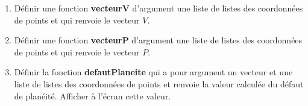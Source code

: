 \documentclass[10pt,fleqn]{article} %
\begin{document}
\begin{enumerate}

\item Définir une fonction \textbf{vecteurV} d'argument une liste de listes des coordonnées de points et qui renvoie le vecteur $V$. 
\item Définir une fonction \textbf{vecteurP} d'argument une liste de listes des coordonnées de points et qui renvoie le vecteur $P$.
\item Définir la fonction \textbf{defautPlaneite} qui a pour argument un vecteur et une liste de listes des coordonnées de points et renvoie la valeur calculée du défaut de planéité. Afficher à l'écran cette valeur.
\end{enumerate}
\end{document}
